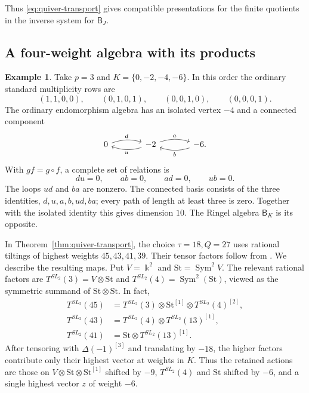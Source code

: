 \documentclass[11pt,reqno]{amsart}
\newcommand{\kk}{\Bbbk}\newcommand{\ZZ}{\mathbb Z}\newcommand{\NN}{\mathbb N}
\newcommand{\BJ}{\mathsf B_J}\newcommand{\BK}{\mathsf B_K}\newcommand{\TJ}{\mathbb T_J}\newcommand{\GK}{\mathsf G_K}\newcommand{\GJ}{\mathsf G_J}
\theoremstyle{definition}
\newtheorem{example}[theorem]{Example}
\theoremstyle{remark}
\numberwithin{equation}{section}
\begin{document}
Thus \eqref{eq:quiver-transport} gives compatible
presentations for the finite quotients in the inverse system for $\BJ$.

\subsection{A four-weight algebra with its products}
\begin{example}\label{ex:mixed-four}
Take $p=3$ and $K=\{0,-2,-4,-6\}$. In this order the ordinary
standard multiplicity rows are
\[
 (1,1,0,0),\qquad(0,1,0,1),\qquad(0,0,1,0),\qquad(0,0,0,1).
\]
The ordinary endomorphism algebra has an isolated vertex $-4$ and
a connected component
\[
 \begin{tikzcd}[column sep=large]
 0\arrow[r,bend left=17,"d"]&
 -2\arrow[l,bend left=17,"u"]\arrow[r,bend left=17,"a"]&
 -6\arrow[l,bend left=17,"b"].
 \end{tikzcd}
\]
With $gf=g\circ f$, a complete set of relations is
\[
 du=0,\qquad ab=0,\qquad ad=0,\qquad ub=0.
\]
The loops $ud$ and $ba$ are nonzero. The connected basis consists
of the three identities, $d,u,a,b,ud,ba$; every path of length at
least three is zero. Together with the isolated identity this gives
dimension $10$. The Ringel algebra $\BK$ is its opposite.

In Theorem~\ref{thm:quiver-transport}, the choice $\tau=18,Q=27$
uses rational tiltings of highest weights $45,43,41,39$.
Their tensor factors follow from \cite[Proposition~3.4(a)]{STWZ}.
We describe the resulting maps. Put $V=\kk^2$ and
$\mathrm{St}=\operatorname{Sym}^2V$. The relevant rational factors are
$T^{SL_2}(3)=V\otimes\mathrm{St}$ and
$T^{SL_2}(4)=\operatorname{Sym}^2(\mathrm{St})$, viewed as the
symmetric summand of $\mathrm{St}\otimes\mathrm{St}$.
In fact,
\[
 \begin{aligned}
 T^{SL_2}(45)&=T^{SL_2}(3)\otimes\mathrm{St}^{[1]}
                         \otimes T^{SL_2}(4)^{[2]},\\
 T^{SL_2}(43)&=T^{SL_2}(4)\otimes T^{SL_2}(13)^{[1]},\\
 T^{SL_2}(41)&=\mathrm{St}\otimes T^{SL_2}(13)^{[1]}.
 \end{aligned}
\]
After tensoring with $\Delta(-1)^{[3]}$ and translating by $-18$,
the higher factors contribute only their highest vector at weights
in $K$. Thus the retained actions are those on
$V\otimes\mathrm{St}\otimes\mathrm{St}^{[1]}$ shifted by $-9$,
$T^{SL_2}(4)$ and $\mathrm{St}$ shifted by $-6$, and a single
highest vector $z$ of weight $-6$.


\end{example}
\end{document}
